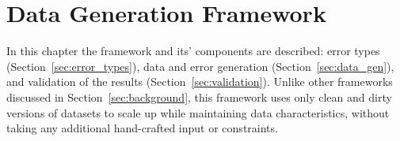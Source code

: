 \chapter{Data Generation Framework}
\label{sec:benchmark}
In this chapter the framework and its' components are described: error types (Section~\ref{sec:error_types}), data and error generation (Section~\ref{sec:data_gen}), and validation of the results (Section~\ref{sec:validation}).
Unlike other frameworks discussed in Section~\ref{sec:background}, this framework uses only clean and dirty versions of datasets to scale up while maintaining data characteristics, without taking any additional hand-crafted input or constraints.




